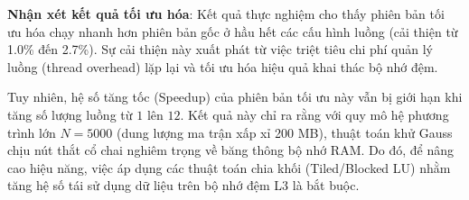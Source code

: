\textbf{Nhận xét kết quả tối ưu hóa}:
Kết quả thực nghiệm cho thấy phiên bản tối ưu hóa chạy nhanh hơn phiên bản gốc ở hầu hết các cấu hình luồng (cải thiện từ 1.0\% đến 2.7\%). Sự cải thiện này xuất phát từ việc triệt tiêu chi phí quản lý luồng (thread overhead) lặp lại và tối ưu hóa hiệu quả khai thác bộ nhớ đệm.

Tuy nhiên, hệ số tăng tốc (Speedup) của phiên bản tối ưu này vẫn bị giới hạn khi tăng số lượng luồng từ $1$ lên $12$. Kết quả này chỉ ra rằng với quy mô hệ phương trình lớn $N=5000$ (dung lượng ma trận xấp xỉ 200 MB), thuật toán khử Gauss chịu nút thắt cổ chai nghiêm trọng về băng thông bộ nhớ RAM. Do đó, để nâng cao hiệu năng, việc áp dụng các thuật toán chia khối (Tiled/Blocked LU) nhằm tăng hệ số tái sử dụng dữ liệu trên bộ nhớ đệm L3 là bắt buộc.


